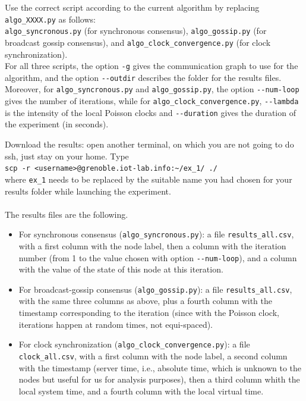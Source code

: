 \documentclass{article}
\begin{document}
    Use the correct script according to the current algorithm by replacing
    \verb=algo_XXXX.py= as follows:\\
\verb=algo_syncronous.py= (for synchronous consensus),
\verb=algo_gossip.py= (for broadcast gossip consensus), and
\verb=algo_clock_convergence.py= (for clock synchronization). \\
	For all three scripts, the option \verb=-g= gives the communication graph to use for the algorithm, and the option \verb=--outdir= describes the folder for the results files.\\
	Moreover, for \verb=algo_syncronous.py= and \verb=algo_gossip.py=, the option \verb=--num-loop= gives the number of iterations, while for \verb=algo_clock_convergence.py=, \verb=--lambda= is the intensity of the local Poisson clocks and \verb=--duration= gives the duration of the experiment (in seconds).


Download the results: open another terminal, on which you are not going to do ssh, just stay on your home. Type \\
         \verb=scp -r <username>@grenoble.iot-lab.info:~/ex_1/ ./=\\
where \verb=ex_1=  needs to be replaced by the suitable name you had chosen for your results folder while launching the experiment.

\paragraph{}The results files are the following.
\begin{itemize}
\item For synchronous consensus (\verb=algo_syncronous.py=):
a file \verb=results_all.csv=, with a first column with the node label, then a column with the iteration number (from 1 to the value chosen with option \verb=--num-loop=), and a column with the value of the state of this node at this iteration.
\item For broadcast-gossip consensus (\verb=algo_gossip.py=):
a file \verb=results_all.csv=, with the same three columns as above, plus a fourth column with the timestamp corresponding to the iteration (since with the Poisson clock, iterations happen at random times, not equi-spaced).
\item For clock synchronization (\verb=algo_clock_convergence.py=):
a file \verb=clock_all.csv=, with a first column with the node label, a second column with the timestamp (server time, i.e., absolute time, which is unknown to the nodes but useful for us for analysis purposes), then a third column whith the local system time, and a fourth column with the local virtual time.
\end{itemize}
\end{document}
